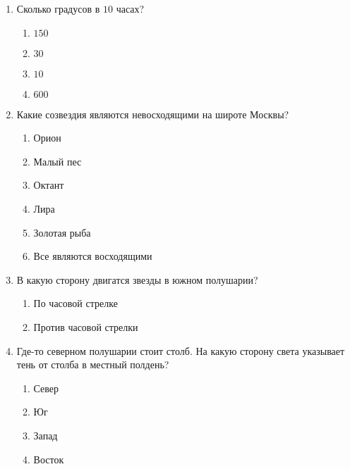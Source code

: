 \documentclass[12pt]{article}
\begin{document}
\begin{enumerate}
	\item Сколько градусов в $10$ часах?
	\begin{multicols}{2}
		\begin{enumerate}[label=\textbf{\Alph*.}]
			\item{$150$} \item{$30$}
			\item{$10$} \item{$600$}
		\end{enumerate}
	\end{multicols}

	\item Какие созвездия являются невосходящими на широте Москвы?
	\begin{multicols}{2}
		\begin{enumerate}[label=\textbf{\Alph*.}]
			\item{Орион} \item{Малый пес} \item{Октант} 
			\item{Лира} \item{Золотая рыба} \item{Все являются восходящими} 
		\end{enumerate}
	\end{multicols}

	\item В какую сторону двигатся звезды в южном полушарии?
	\begin{multicols}{2}
		\begin{enumerate}[label=\textbf{\Alph*.}]
			\item{По часовой стрелке} 
			\item{Против часовой стрелки} 
		\end{enumerate}
	\end{multicols}

	\item Где-то северном полушарии стоит столб. На какую сторону света указывает тень от столба в местный полдень?
	\begin{multicols}{2}
		\begin{enumerate}[label=\textbf{\Alph*.}]
			\item{Север} \item{Юг}
			\item{Запад} \item{Восток} 
		\end{enumerate}
	\end{multicols}


\end{enumerate}
\end{document}
